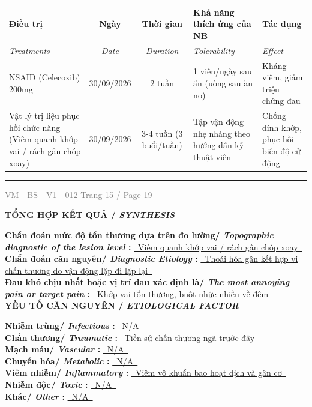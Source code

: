 \documentclass[11pt,a4paper]{article}
\newcommand{\SectionTitle}[2]{%
    \vspace{0.12cm}
    {\bfseries\large #1/ \textit{#2}}\par
    \vspace{0.06cm}
}
\newcommand{\SubSectionTitle}[2]{%
    \vspace{0.08cm}
    {\bfseries #1/ \textit{#2}}\par
}
\newcommand{\FormFooter}[2]{%
    \vfill
    \hrule
    \vspace{0.08cm}
    \noindent
    \small \textcolor{gray}{VM - BS - V1 - 012} \hfill \small \textcolor{gray}{Trang #1 / Page #2}
}
\begin{document}
\noindent
\begin{tabularx}{\textwidth}{|X|c|c|X|X|}
    \hline
    \rowcolor{gray!15}
    \textbf{\small Điều trị} & 
    \textbf{\small Ngày} & 
    \textbf{\small Thời gian} & 
    \textbf{\small Khả năng thích ứng của NB} & 
    \textbf{\small Tác dụng} \\
    \rowcolor{gray!15}
    \textit{\footnotesize Treatments} & 
    \textit{\footnotesize Date} & 
    \textit{\footnotesize Duration} & 
    \textit{\footnotesize Tolerability} & 
    \textit{\footnotesize Effect} \\
    \hline
        NSAID (Celecoxib) 200mg & 
        30/09/2026 & 
        2 tuần & 
        1 viên/ngày sau ăn (uống sau ăn no) & 
        Kháng viêm, giảm triệu chứng đau \\ \hline
        Vật lý trị liệu phục hồi chức năng (Viêm quanh khớp vai / rách gân chóp xoay) & 
        30/09/2026 & 
        3-4 tuần (3 buổi/tuần) & 
        Tập vận động nhẹ nhàng theo hướng dẫn kỹ thuật viên & 
        Chống dính khớp, phục hồi biên độ cử động \\ \hline
\end{tabularx}

\FormFooter{ 15 }{ 19 }
\newpage

\SectionTitle{ TỔNG HỢP KẾT QUẢ }{ SYNTHESIS }

\textbf{ Chẩn đoán mức độ tổn thương dựa trên đo lường/ \textit{ Topographic diagnostic of the lesion level }: } \underline{~Viêm quanh khớp vai / rách gân chóp xoay~}\\[0.12cm]
\textbf{ Chẩn đoán căn nguyên/ \textit{ Diagnostic Etiology }: } \underline{~Thoái hóa gân kết hợp vi chấn thương do vận động lặp đi lặp lại~}\\[0.12cm]
\textbf{ Đau khó chịu nhất hoặc vị trí đau xác định là/ \textit{ The most annoying pain or target pain }: } \underline{~Khớp vai tổn thương, buốt nhức nhiều về đêm~}\\[0.12cm]

\SubSectionTitle{ YẾU TỐ CĂN NGUYÊN }{ ETIOLOGICAL FACTOR }

\textbf{ Nhiễm trùng/ \textit{ Infectious }: } \underline{~N/A~}\\[0.12cm]
\textbf{ Chấn thương/ \textit{ Traumatic }: } \underline{~Tiền sử chấn thương ngã trước đây~}\\[0.12cm]
\textbf{ Mạch máu/ \textit{ Vascular }: } \underline{~N/A~}\\[0.12cm]
\textbf{ Chuyển hóa/ \textit{ Metabolic }: } \underline{~N/A~}\\[0.12cm]
\textbf{ Viêm nhiễm/ \textit{ Inflammatory }: } \underline{~Viêm vô khuẩn bao hoạt dịch và gân cơ~}\\[0.12cm]
\textbf{ Nhiễm độc/ \textit{ Toxic }: } \underline{~N/A~}\\[0.12cm]
\textbf{ Khác/ \textit{ Other }: } \underline{~N/A~}\\[0.12cm]
\end{document}
